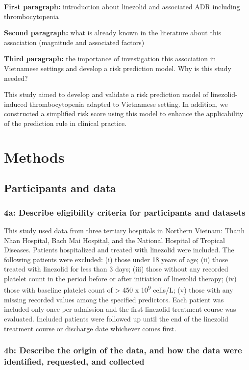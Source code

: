 \documentclass[
  letterpaper,
  DIV=11,
  numbers=noendperiod]{scrartcl}
\begin{document}
\textbf{First paragraph:} introduction about linezolid and associated
ADR including thrombocytopenia

\textbf{Second paragraph:} what is already known in the literature about
this association (magnitude and associated factors)

\textbf{Third paragraph:} the importance of investigation this
association in Vietnamese settings and develop a risk prediction model.
Why is this study needed?

This study aimed to develop and validate a risk prediction model of
linezolid-induced thrombocytopenia adapted to Vietnamese setting. In
addition, we constructed a simplified risk score using this model to
enhance the applicability of the prediction rule in clinical practice.

\section{Methods}\label{methods}

\subsection{Participants and data}\label{participants-and-data}

\subsubsection{4a: Describe eligibility criteria for participants and
datasets}\label{a-describe-eligibility-criteria-for-participants-and-datasets}

This study used data from three tertiary hospitals in Northern Vietnam:
Thanh Nhan Hospital, Bach Mai Hospital, and the National Hospital of
Tropical Diseases. Patients hospitalized and treated with linezolid were
included. The following patients were excluded: (i) those under 18 years
of age; (ii) those treated with linezolid for less than 3 days; (iii)
those without any recorded platelet count in the period before or after
initiation of linezolid therapy; (iv) those with baseline platelet count
of \textgreater{} 450 x 10\textsuperscript{9} cells/L; (v) those with
any missing recorded values among the specified predictors. Each patient
was included only once per admission and the first linezolid treatment
course was evaluated. Included patients were followed up until the end
of the linezolid treatment course or discharge date whichever comes
first.

\subsubsection{4b: Describe the origin of the data, and how the data
were identified, requested, and
collected}\label{b-describe-the-origin-of-the-data-and-how-the-data-were-identified-requested-and-collected}
\end{document}
